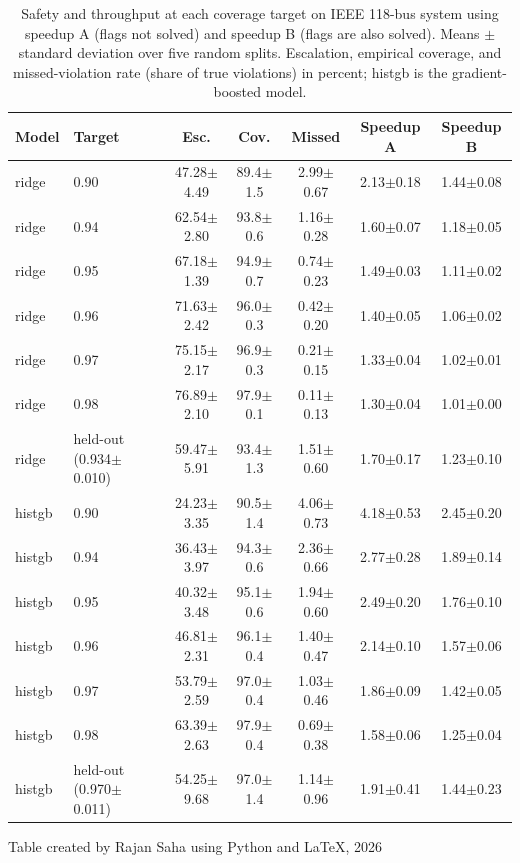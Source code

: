 \documentclass[12pt]{article}
\begin{document}
\begin{table}[htbp]
\centering
\caption{Safety and throughput at each coverage target on IEEE 118-bus system using speedup A (flags not solved) and speedup B (flags are also solved). Means $\pm$ standard deviation over five random splits. Escalation, empirical coverage, and missed-violation rate (share of true violations) in percent; histgb is the gradient-boosted model.}
\label{tab:ops}
\small
\setlength{\tabcolsep}{4pt}
\begin{tabular}{llccccc}
\toprule
Model & Target & Esc. & Cov. & Missed & Speedup A & Speedup B \\
\midrule
ridge  & 0.90 & 47.28$\pm$4.49 & 89.4$\pm$1.5 & 2.99$\pm$0.67 & 2.13$\pm$0.18 & 1.44$\pm$0.08 \\
ridge  & 0.94 & 62.54$\pm$2.80 & 93.8$\pm$0.6 & 1.16$\pm$0.28 & 1.60$\pm$0.07 & 1.18$\pm$0.05 \\
ridge  & 0.95 & 67.18$\pm$1.39 & 94.9$\pm$0.7 & 0.74$\pm$0.23 & 1.49$\pm$0.03 & 1.11$\pm$0.02 \\
ridge  & 0.96 & 71.63$\pm$2.42 & 96.0$\pm$0.3 & 0.42$\pm$0.20 & 1.40$\pm$0.05 & 1.06$\pm$0.02 \\
ridge  & 0.97 & 75.15$\pm$2.17 & 96.9$\pm$0.3 & 0.21$\pm$0.15 & 1.33$\pm$0.04 & 1.02$\pm$0.01 \\
ridge  & 0.98 & 76.89$\pm$2.10 & 97.9$\pm$0.1 & 0.11$\pm$0.13 & 1.30$\pm$0.04 & 1.01$\pm$0.00 \\
ridge  & held-out (0.934$\pm$0.010) & 59.47$\pm$5.91 & 93.4$\pm$1.3 & 1.51$\pm$0.60 & 1.70$\pm$0.17 & 1.23$\pm$0.10 \\
\addlinespace
histgb & 0.90 & 24.23$\pm$3.35 & 90.5$\pm$1.4 & 4.06$\pm$0.73 & 4.18$\pm$0.53 & 2.45$\pm$0.20 \\
histgb & 0.94 & 36.43$\pm$3.97 & 94.3$\pm$0.6 & 2.36$\pm$0.66 & 2.77$\pm$0.28 & 1.89$\pm$0.14 \\
histgb & 0.95 & 40.32$\pm$3.48 & 95.1$\pm$0.6 & 1.94$\pm$0.60 & 2.49$\pm$0.20 & 1.76$\pm$0.10 \\
histgb & 0.96 & 46.81$\pm$2.31 & 96.1$\pm$0.4 & 1.40$\pm$0.47 & 2.14$\pm$0.10 & 1.57$\pm$0.06 \\
histgb & 0.97 & 53.79$\pm$2.59 & 97.0$\pm$0.4 & 1.03$\pm$0.46 & 1.86$\pm$0.09 & 1.42$\pm$0.05 \\
histgb & 0.98 & 63.39$\pm$2.63 & 97.9$\pm$0.4 & 0.69$\pm$0.38 & 1.58$\pm$0.06 & 1.25$\pm$0.04 \\
histgb & held-out (0.970$\pm$0.011) & 54.25$\pm$9.68 & 97.0$\pm$1.4 & 1.14$\pm$0.96 & 1.91$\pm$0.41 & 1.44$\pm$0.23 \\
\bottomrule
\end{tabular}

\vspace*{1ex}
{\small Table created by Rajan Saha using Python and \LaTeX, 2026}
\end{table}
\end{document}
